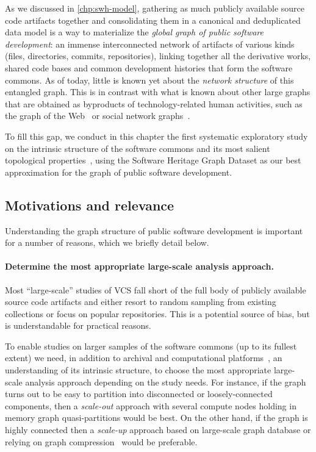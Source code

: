 As we discussed in \cref{chp:swh-model}, gathering as much publicly available
source code artifacts together and consolidating them in a canonical and
deduplicated data model is a way to materialize the \emph{global graph of
public software development}: an immense interconnected network of artifacts of
various kinds (files, directories, commits, repositories), linking together all
the derivative works, shared code bases and common development histories that
form the software commons. As of today, little is known yet about the
\emph{network structure} of this entangled graph. This is in contrast with what
is known about other large graphs that are obtained as byproducts of
technology-related human activities, such as the graph of the
Web~\cite{vigna2015webstruct} or social network
graphs~\cite{ugander2011facebook, myers2014twitter}.

To fill this gap, we conduct in this chapter the first systematic exploratory
study on the intrinsic structure of the software commons and its most salient
topological properties~\cite{barabasi2002networkstats}, using the Software
Heritage Graph Dataset as our best approximation for the graph of public
software development.

\subsection{Motivations and relevance}

Understanding the graph structure of public software development is important
for a number of reasons, which we briefly detail below.

\paragraph{Determine the most appropriate large-scale analysis approach.}

Most ``large-scale'' studies of VCS fall short of the full body of publicly
available source code artifacts and either resort to random sampling from
existing collections or focus on popular repositories. This is a potential
source of bias, but is understandable for practical reasons.

To enable studies on larger samples of the software commons (up to its fullest
extent) we need, in addition to archival and computational
platforms~\cite{dyer2013boa, swhcacm2018, mockus2019woc}, an understanding of
its intrinsic structure, to choose the most appropriate large-scale analysis
approach depending on the study needs.  For instance, if the graph turns out to
be easy to partition into disconnected or loosely-connected components, then a
\emph{scale-out} approach with several compute nodes holding in memory graph
quasi-partitions would be best. On the other hand, if the graph is highly
connected then a \emph{scale-up} approach based on large-scale graph database
or relying on graph compression~\cite{saner-2020-swh-graph} would be
preferable.


